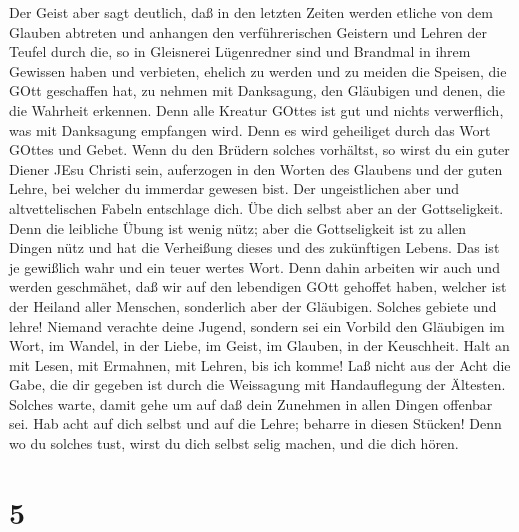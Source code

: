  Der Geist aber sagt deutlich, daß in den letzten Zeiten
werden etliche von dem Glauben abtreten und anhangen den verführerischen
Geistern und Lehren der Teufel  durch die, so in Gleisnerei
Lügenredner sind und Brandmal in ihrem Gewissen haben  und
verbieten, ehelich zu werden und zu meiden die Speisen, die GOtt
geschaffen hat, zu nehmen mit Danksagung, den Gläubigen und denen, die
die Wahrheit erkennen.  Denn alle Kreatur GOttes ist gut und
nichts verwerflich, was mit Danksagung empfangen wird.  Denn
es wird geheiliget durch das Wort GOttes und Gebet.  Wenn du
den Brüdern solches vorhältst, so wirst du ein guter Diener JEsu Christi
sein, auferzogen in den Worten des Glaubens und der guten Lehre, bei
welcher du immerdar gewesen bist.  Der ungeistlichen aber
und altvettelischen Fabeln entschlage dich. Übe dich selbst aber an der
Gottseligkeit.  Denn die leibliche Übung ist wenig nütz;
aber die Gottseligkeit ist zu allen Dingen nütz und hat die Verheißung
dieses und des zukünftigen Lebens.  Das ist je gewißlich
wahr und ein teuer wertes Wort.  Denn dahin arbeiten wir
auch und werden geschmähet, daß wir auf den lebendigen GOtt gehoffet
haben, welcher ist der Heiland aller Menschen, sonderlich aber der
Gläubigen.  Solches gebiete und lehre! 
Niemand verachte deine Jugend, sondern sei ein Vorbild den Gläubigen im
Wort, im Wandel, in der Liebe, im Geist, im Glauben, in der Keuschheit.
 Halt an mit Lesen, mit Ermahnen, mit Lehren, bis ich
komme!  Laß nicht aus der Acht die Gabe, die dir gegeben
ist durch die Weissagung mit Handauflegung der Ältesten. 
Solches warte, damit gehe um auf daß dein Zunehmen in allen Dingen
offenbar sei.  Hab acht auf dich selbst und auf die Lehre;
beharre in diesen Stücken! Denn wo du solches tust, wirst du dich selbst
selig machen, und die dich hören.

\hypertarget{section-4}{%
\section{5}\label{section-4}}

